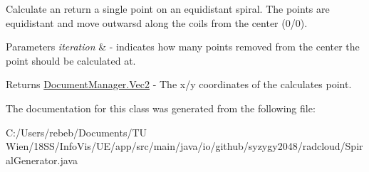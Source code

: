 Calculate an return a single point on an equidistant spiral. The points are equidistant and move outwarsd along the coils from the center (0/0).


\begin{DoxyParams}{Parameters}
{\em iteration} & -\/ indicates how many points removed from the center the point should be calculated at. \\
\hline
\end{DoxyParams}
\begin{DoxyReturn}{Returns}
\mbox{\hyperlink{classio_1_1github_1_1syzygy2048_1_1radcloud_1_1_document_manager_1_1_vec2}{Document\+Manager.\+Vec2}} -\/ The x/y coordinates of the calculates point. 
\end{DoxyReturn}


The documentation for this class was generated from the following file\+:\begin{DoxyCompactItemize}
\item 
C\+:/\+Users/rebeb/\+Documents/\+T\+U Wien/18\+S\+S/\+Info\+Vis/\+U\+E/app/src/main/java/io/github/syzygy2048/radcloud/Spiral\+Generator.\+java\end{DoxyCompactItemize}
